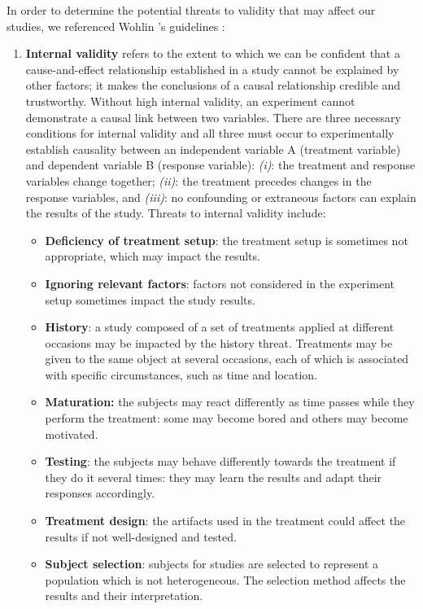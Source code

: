 In order to determine the potential threats to validity that may affect our studies, we referenced Wohlin \etal's guidelines \cite{DBLP:books/sp/WohlinRHOR00}:
\begin{enumerate}
    \item \textbf{Internal validity} refers to the extent to which we can be confident that a cause-and-effect relationship established in a study cannot be explained by other factors; it makes the conclusions of a causal relationship credible and trustworthy. Without high internal validity, an experiment cannot demonstrate a causal link between two variables.
    There are three necessary conditions for internal validity and all three must occur to experimentally establish causality between an independent variable A (treatment variable) and dependent variable B (response variable): \textit{(i)}: the treatment and response variables change together; \textit{(ii)}: the treatment precedes changes in the response variables, and \textit{(iii)}: no confounding or extraneous factors can explain the results of the study.
    Threats to internal validity include: 
    \begin{itemize}
        \item \textbf{Deficiency of treatment setup}: the treatment setup is sometimes not appropriate, which may impact the results.
        \item \textbf{Ignoring relevant factors}: factors not considered in the experiment setup sometimes impact the study results.
        \item \textbf{History}: a study composed of a set of treatments applied at different occasions may be impacted by the history threat. Treatments may be given to the same object at several occasions, each of which is associated with specific circumstances, such as time and location.
        \item \textbf{Maturation:} the subjects may react differently as time passes while they perform the treatment: some may become bored and others may become motivated.
        \item \textbf{Testing}: the subjects may behave differently towards the treatment if they do it several times: they may learn the results and adapt their responses accordingly.
        \item \textbf{Treatment design}: the artifacts used in the treatment could affect the results if not well-designed and tested.
        \item \textbf{Subject selection}: subjects for studies are selected to represent a population which is not heterogeneous. The selection method affects the results and their interpretation.

\end{itemize}
\end{enumerate}
